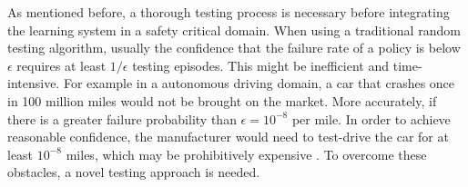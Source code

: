 As mentioned before, a thorough testing process is necessary before integrating the learning system in a safety critical domain. When using a traditional random testing algorithm, usually the confidence that the failure rate of a policy is below $\epsilon$ requires at least $1/\epsilon$ testing episodes. This might be inefficient and time-intensive. For example in a autonomous driving domain, a car that crashes once in 100 million miles would not be brought on the market. More accurately, if there is a greater failure probability than $\epsilon = 10^{-8}$ per mile. In order to achieve reasonable confidence, the manufacturer would need to test-drive the car for at least $10^{-8}$ miles, which may be prohibitively expensive \cite{uesato18}. To overcome these obstacles, a novel testing approach is needed.